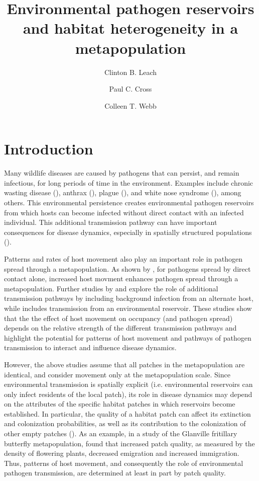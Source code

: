 \documentclass{svjour3}
\begin{document}
\title{Environmental pathogen reservoirs and habitat heterogeneity in a metapopulation}

\author{Clinton B. Leach \and Paul C. Cross \and Colleen T. Webb}




\maketitle

\section{Introduction}
\label{intro}

Many wildlife diseases are caused by pathogens that can persist, and remain infectious, for long periods of time in the environment.  Examples include chronic wasting disease (\cite{Miller2006}), anthrax (\cite{Dragon1995}), plague (\cite{Eisen2008}), and white nose syndrome (\cite{Lindner2011}), among others.  This environmental persistence creates environmental pathogen reservoirs from which hosts can become infected without direct contact with an infected individual.  This additional transmission pathway can have important consequences for disease dynamics, especially in spatially structured populations (\cite{Park2012}).

Patterns and rates of host movement also play an important role in pathogen spread through a metapopulation.  As shown by \cite{Hess1996}, for pathogens spread by direct contact alone, increased host movment enhances pathogen spread through a metapopulation.  Further studies by \cite{Gog2002} and \cite{McCallum2002} explore the role of additional transmission pathways by including background infection from an alternate host, while \cite{Park2012} includes transmission from an environmental reservoir.  These studies show that the the effect of host movement on occupancy (and pathogen spread) depends on the relative strength of the different transmission pathways and highlight the potential for patterns of host movement and pathways of pathogen transmission to interact and influence disease dynamics.   

However, the above studies assume that all patches in the metapopulation are identical, and consider movement only at the metapopulation scale.  Since environmental transmission is spatially explicit (i.e. environmental reservoirs can only infect residents of the local patch), its role in disease dynamics may depend on the attributes of the specific habitat patches in which reservoirs become established.  In particular, the quality of a habitat patch can affect its extinction and colonization probabilities, as well as its contribution to the colonization of other empty patches (\cite{Moilanen1998}).  As an example, in a study of the Glanville fritillary butterfly metapopulation, \cite{Moilanen1998} found that increased patch quality, as measured by the density of flowering plants, decreased emigration and increased immigration.  Thus, patterns of host movement, and consequently the role of environmental pathogen transmission, are determined at least in part by patch quality.  
\end{document}
